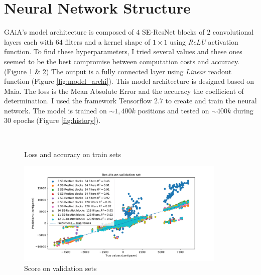 \documentclass[unnumsec,webpdf,contemporary,large]{Article}%
\theoremstyle{thmstyleone}%
\theoremstyle{thmstyletwo}%
\theoremstyle{thmstylethree}%
\begin{document}
\section{Neural Network Structure}
GAiA's model architecture is composed of $4$ SE-ResNet blocks of $2$ convolutional layers
each with $64$ filters and a kernel shape of $1\times1$ using \textit{ReLU} activation function.
To find these hyperparameters, I tried several values and these ones seemed to be
the best compromise between computation costs and accuracy.
(Figure \ref{fig:acc_loss} \& \ref{fig:score_valid})
The output is a fully connected layer using \textit{Linear} readout function (Figure \ref{fig:model_archi}).
This model architecture is designed based on Maia\cite{maia}.
The loss is the Mean Absolute Error and the accuracy the coefficient of determination.
I used the framework Tensorflow 2.7\cite{tensorflow} to create and train the neural network.
The model is trained on $\sim 1,400k$ positions and tested on $\sim 400k$
during 30 epochs (Figure \ref{fig:history}).

\begin{figure}[H]
  \captionsetup[subfigure]{labelformat=empty}
  \centering
  \\
  \caption{Loss and accuracy on train sets}
  \label{fig:acc_loss}
\end{figure}

\begin{figure}[H]
  \centering
  \includegraphics[width=10cm]{model_selection_2.png}
  \caption{Score on validation sets}
  \label{fig:score_valid}
\end{figure}
\end{document}
